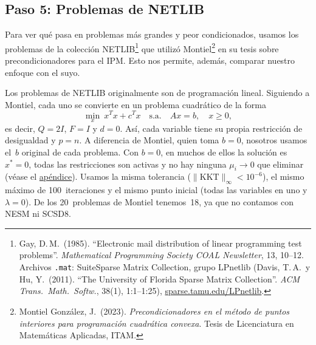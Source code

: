 \subsection*{Paso 5: Problemas de NETLIB}
\label{sec:netlib}

Para ver qué pasa en problemas más grandes y peor condicionados, usamos los problemas de la colección NETLIB\footnote{Gay, D.\,M.\ (1985). ``Electronic mail distribution of linear programming test problems''. \textit{Mathematical Programming Society COAL Newsletter}, 13, 10--12. Archivos \texttt{.mat}: SuiteSparse Matrix Collection, grupo LPnetlib (Davis, T.\,A.\ y Hu, Y.\ (2011). ``The University of Florida Sparse Matrix Collection''. \textit{ACM Trans.\ Math.\ Softw.}, 38(1), 1:1--1:25), \href{https://sparse.tamu.edu/LPnetlib}{sparse.tamu.edu/LPnetlib}.} que utilizó Montiel\footnote{Montiel González, J.\ (2023). \textit{Precondicionadores en el método de puntos interiores para programación cuadrática convexa}. Tesis de Licenciatura en Matemáticas Aplicadas, ITAM.} en su tesis sobre precondicionadores para el IPM. Esto nos permite, además, comparar nuestro enfoque con el suyo.

Los problemas de NETLIB originalmente son de programación lineal. Siguiendo a Montiel, cada uno se convierte en un problema cuadrático de la forma
\[
\min_x\ x^Tx + c^Tx \quad \text{s.a.} \quad Ax = b, \quad x \ge 0,
\]
es decir, $Q = 2I$, $F = I$ y $d = 0$.
Así, cada variable tiene su propia restricción de desigualdad y $p = n$.
A diferencia de Montiel, quien toma $b = 0$, nosotros usamos el~$b$ original de cada problema. Con $b = 0$, en muchos de ellos la solución es $x^* = 0$, todas las restricciones son activas y no hay ninguna $\mu_i \to 0$ que eliminar (véase el \hyperref[app:netlib_b0]{apéndice}). Usamos la misma tolerancia ($\|\text{KKT}\|_\infty < 10^{-6}$), el mismo máximo de 100~iteraciones y el mismo punto inicial (todas las variables en uno y $\lambda = 0$).
De los 20~problemas de Montiel tenemos~18, ya que no contamos con NESM ni SCSD8.

